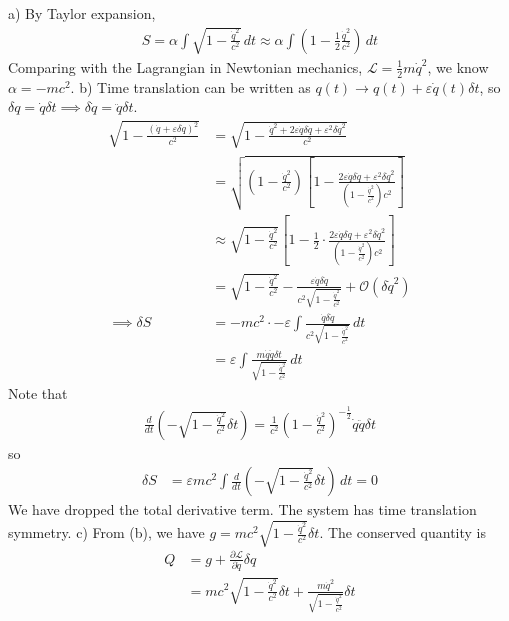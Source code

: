 \documentclass[12pt]{book} %
\numberwithin{equation}{chapter}
\def\a{\alpha}
\def\d{\delta}
\def\e{\varepsilon}
\def\La{\mathcal{L}}
\def\bigO{\mathcal{O}}
\def\p{\partial}
\begin{document}
\begin{solbox}
a) By Taylor expansion,
\begin{align*}
S=\a \int\sqrt{1-\frac{\dot{q}^{2}}{c^{2}}}\,dt\approx \a \int\left(1-\frac{1}{2}\frac{\dot{q}^{2}}{c^{2}}\right)\,dt
\end{align*}
Comparing with the Lagrangian in Newtonian mechanics, $\La=\frac{1}{2}m\dot{q}^{2}$, we know $\a=-mc^{2}$.\bigskip\newline
b) Time translation can be written as $q(t)\to q(t)+\e \dot{q}(t)\d t$, so $\d q=\dot{q}\d t\implies \d \dot{q}=\ddot{q}\d t$.
\begin{align*}
\sqrt{1-\frac{\left(\dot{q}+\e\d\dot{q}\right)^{2}}{c^{2}}}&=\sqrt{1-\frac{\dot{q}^{2}+2\e\dot{q}\d\dot{q}+\e^{2}\d\dot{q}^{2}}{c^{2}}}\\
&=\sqrt{\left(1-\frac{\dot{q}^{2}}{c^{2}}\right)\left[1-\frac{2\e\dot{q}\d\dot{q}+\e^{2}\d\dot{q}^{2}}{\left(1-\frac{\dot{q}^{2}}{c^{2}}\right)c^{2}}\right]}\\
&\approx \sqrt{1-\frac{\dot{q}^{2}}{c^{2}}}\left[1-\frac{1}{2}\cdot\frac{2\e\dot{q}\d\dot{q}+\e^{2}\d\dot{q}^{2}}{\left(1-\frac{\dot{q}^{2}}{c^{2}}\right)c^{2}}\right]\\
&=\sqrt{1-\frac{\dot{q}^{2}}{c^{2}}}-\frac{\e\dot{q}\d\dot{q}}{c^{2}\sqrt{1-\frac{\dot{q}^{2}}{c^{2}}}}+\bigO\left(\d\dot{q}^{2}\right)\\
\implies \d S&=-mc^{2}\cdot -\e\int\frac{\dot{q}\d\dot{q}}{c^{2}\sqrt{1-\frac{\dot{q}^{2}}{c^{2}}}}\,dt\\
&=\e\int\frac{m\dot{q}\ddot{q}\d t}{\sqrt{1-\frac{\dot{q}^{2}}{c^{2}}}}\,dt
\end{align*}
Note that 
\begin{align*}
\frac{d}{dt}\left(-\sqrt{1-\frac{\dot{q}^{2}}{c^{2}}}\d t\right)=\frac{1}{c^{2}}\left(1-\frac{\dot{q}^{2}}{c^{2}}\right)^{-\frac{1}{2}}\dot{q}\ddot{q}\d t
\end{align*}
so
\begin{align*}
\d S&=\e mc^{2}\int\frac{d}{dt}\left(-\sqrt{1-\frac{\dot{q}^{2}}{c^{2}}}\d t\right)\,dt=0
\end{align*}
We have dropped the total derivative term. The system has time translation symmetry.\bigskip\newline
c) From (b), we have $g=mc^{2}\sqrt{1-\frac{\dot{q}^{2}}{c^{2}}}\d t$. The conserved quantity is
\begin{align*}
Q&=g+\frac{\p \La}{\p \dot{q}}\d q\\
&=mc^{2}\sqrt{1-\frac{\dot{q}^{2}}{c^{2}}}\d t+\frac{m\dot{q}^{2}}{\sqrt{1-\frac{\dot{q}^{2}}{c^{2}}}}\d t\\

\end{align*}
\end{solbox}
\end{document}
